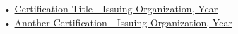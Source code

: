 • \href{}{Certification Title - Issuing Organization, Year} \\
\vspace*{1mm}
• \href{}{Another Certification - Issuing Organization, Year} \\
\vspace*{1mm}
